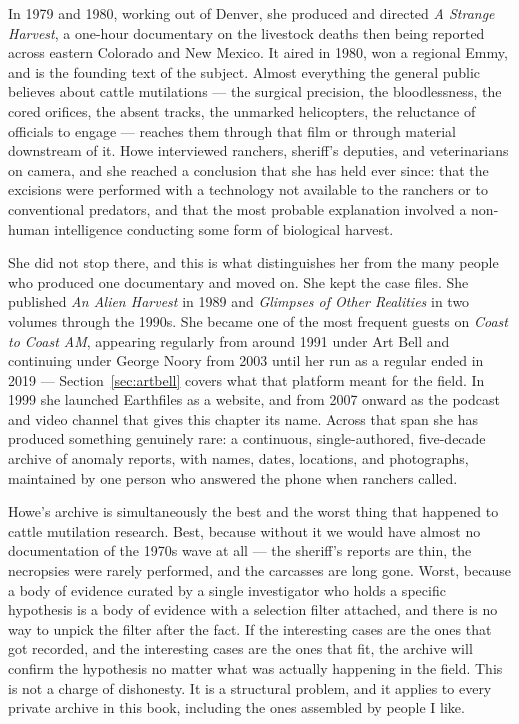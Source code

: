 In 1979 and 1980, working out of Denver, she produced and directed \emph{A Strange Harvest}, a
one-hour documentary on the livestock deaths then being reported across eastern Colorado and New
Mexico. It aired in 1980, won a regional Emmy, and is the founding text of the subject. Almost
everything the general public believes about cattle mutilations --- the surgical precision, the
bloodlessness, the cored orifices, the absent tracks, the unmarked helicopters, the reluctance of
officials to engage --- reaches them through that film or through material downstream of it. Howe
interviewed ranchers, sheriff's deputies, and veterinarians on camera, and she reached a
conclusion that she has held ever since: that the excisions were performed with a technology not
available to the ranchers or to conventional predators, and that the most probable explanation
involved a non-human intelligence conducting some form of biological harvest.

She did not stop there, and this is what distinguishes her from the many people who produced one
documentary and moved on. She kept the case files. She published \emph{An Alien Harvest} in 1989
and \emph{Glimpses of Other Realities} in two volumes through the 1990s. She became one of the
most frequent guests on \emph{Coast to Coast AM}, appearing regularly from around 1991 under Art
Bell and continuing under George Noory from 2003 until her run as a regular ended in 2019 ---
Section~\ref{sec:artbell} covers what that platform meant for the field. In 1999 she launched Earthfiles as a
website, and from 2007 onward as the podcast and video channel that gives this chapter its name.
Across that span she has produced something genuinely rare: a continuous, single-authored,
five-decade archive of anomaly reports, with names, dates, locations, and photographs, maintained
by one person who answered the phone when ranchers called.

\begin{funfact}
Howe's archive is simultaneously the best and the worst thing that happened to cattle mutilation
research. Best, because without it we would have almost no documentation of the 1970s wave at all
--- the sheriff's reports are thin, the necropsies were rarely performed, and the carcasses are
long gone. Worst, because a body of evidence curated by a single investigator who holds a specific
hypothesis is a body of evidence with a selection filter attached, and there is no way to unpick
the filter after the fact. If the interesting cases are the ones that got recorded, and the
interesting cases are the ones that fit, the archive will confirm the hypothesis no matter what
was actually happening in the field. This is not a charge of dishonesty. It is a structural
problem, and it applies to every private archive in this book, including the ones assembled by
people I like.
\end{funfact}

